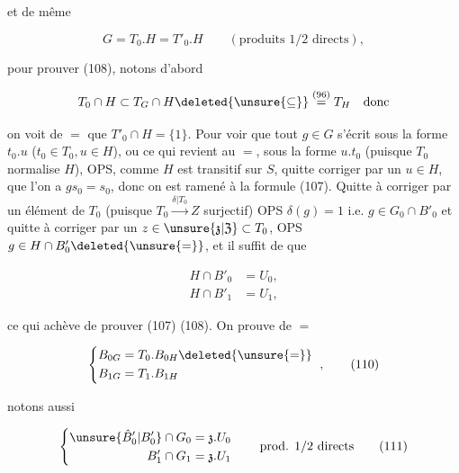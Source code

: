 

et de même

\[G=T_0.H=T'_0.H\qquad(\text{produits }1/2\text{ directs}),\tag*{(108)}\]

pour prouver (108), notons d'abord

\[T_0\cap H\subset T_G\cap H\deleted{\unsure{\subseteq}}\overset{(96)}{=}T_H\quad\text{donc}\]


on voit de $=$ que $T'_0\cap H=\{1\}$. Pour voir que tout $g\in G$ s'écrit sous la forme $t_0.u$ ($t_0\in T_0,u\in H$), ou ce qui revient au $=$, sous la forme $u.t_0$ (puisque $T_0$ normalise $H$), OPS, comme $H$ est transitif sur $S$, quitte   corriger  par un $u\in H$, que l'on a $gs_0=s_0$, donc on est ramené à la formule (107). Quitte à corriger par un élément de $T_0$ (puisque $T_0\xrightarrow{\delta|T_0} Z$ surjectif) OPS $\delta(g)=1$ i.e. $g\in G_0\cap B'_0$ et  quitte à corriger par un $z\in\unsure{\mathfrak{z}|\mathfrak{Z}}\subset T_0$, OPS $g\in H\cap B'_0\deleted{\unsure{=}}$, et il suffit de   que

\[\begin{aligned}
H\cap B'_0&=U_0,\\
H\cap B'_1&=U_1,
\end{aligned}\tag*{(109)}\]

 ce qui achève de prouver (107) (108). On prouve de $=$

\[\left\{\begin{aligned}
B_{0G}&=T_0.B_{0H}\deleted{\unsure{=}}\\
B_{1G}&=T_{1}.B_{1H}
\end{aligned}\right.\ ,\tag*{(110)}\]

notons aussi

\[\left\{\begin{aligned}
\unsure{\hat B'_0|B'_0}\cap G_0&=\mathfrak{z}.U_0\\
B'_1\cap G_1&=\mathfrak{z}.U_1
\end{aligned}\right.\qquad\text{prod. }1/2\text{ directs}\tag*{(111)}\]

